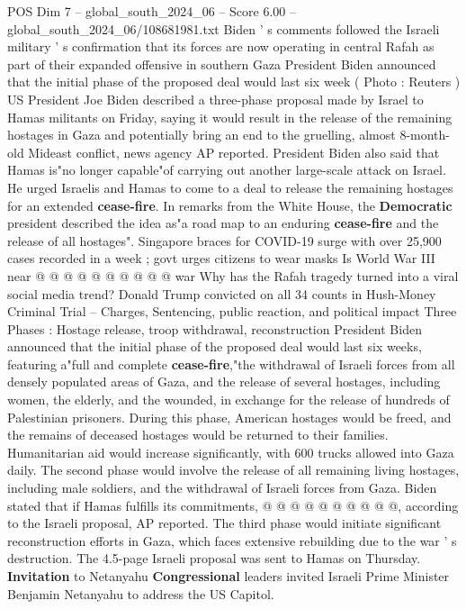 \begin{textsample}{POS Dim 7 – global\_south\_2024\_06 – Score 6.00 – global\_south\_2024\_06/108681981.txt}  \label{ex:f7_pos_239}
Biden ' s comments followed the Israeli military ' s confirmation that its forces are now operating in central Rafah as part of their expanded offensive in southern Gaza President Biden announced that the initial phase of the proposed deal would last six week ( Photo : Reuters ) US President Joe Biden described a three-phase proposal made by Israel to Hamas militants on Friday, saying it would result in the release of the remaining hostages in Gaza and potentially bring an end to the gruelling, almost 8-month-old Mideast conflict, news agency AP reported.
President Biden also said that Hamas is"no longer capable"of carrying out another large-scale attack on Israel.
He urged Israelis and Hamas to come to a deal to release the remaining hostages for an extended \textbf{cease-fire}.
In remarks from the White House, the \textbf{Democratic} president described the idea as"a road map to an enduring \textbf{cease-fire} and the release of all hostages".
Singapore braces for COVID-19 surge with over 25,900 cases recorded in a week ; govt urges citizens to wear masks Is World War III near @ @ @ @ @ @ @ @ @ @ war Why has the Rafah tragedy turned into a viral social media trend?
Donald Trump convicted on all 34 counts in Hush-Money Criminal Trial -- Charges, Sentencing, public reaction, and political impact Three Phases : Hostage release, troop withdrawal, reconstruction President Biden announced that the initial phase of the proposed deal would last six weeks, featuring a"full and complete \textbf{cease-fire},"the withdrawal of Israeli forces from all densely populated areas of Gaza, and the release of several hostages, including women, the elderly, and the wounded, in exchange for the release of hundreds of Palestinian prisoners.
During this phase, American hostages would be freed, and the remains of deceased hostages would be returned to their families.
Humanitarian aid would increase significantly, with 600 trucks allowed into Gaza daily.
The second phase would involve the release of all remaining living hostages, including male soldiers, and the withdrawal of Israeli forces from Gaza.
Biden stated that if Hamas fulfills its commitments, @ @ @ @ @ @ @ @ @ @, according to the Israeli proposal, AP reported.
The third phase would initiate significant reconstruction efforts in Gaza, which faces extensive rebuilding due to the war ' s destruction.
The 4.5-page Israeli proposal was sent to Hamas on Thursday. \textbf{Invitation} to Netanyahu \textbf{Congressional} leaders invited Israeli Prime Minister Benjamin Netanyahu to address the US Capitol.

\end{textsample}
